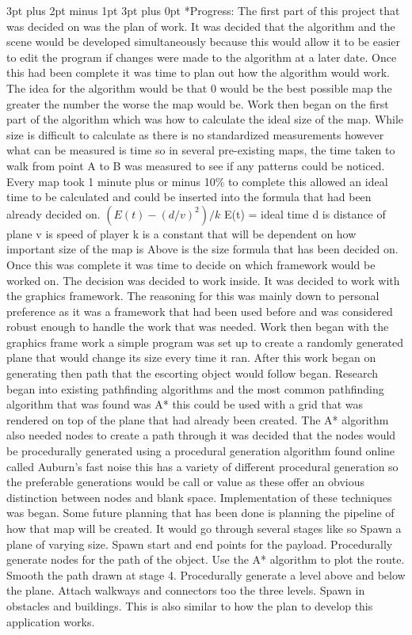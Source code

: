\documentclass[12pt,a4paper,oneside]{book}
\makeatletter
\renewcommand\subsection{\@startsection {subsection}{1}{2mm} %
                               {3pt plus 2pt minus 1pt} %
                               {3pt plus 0pt} %
                               {\normalfont\bfseries}}
\makeatother
\begin{document}
\begin{appendices}
\subsection*{Progress:}
The first part of this project that was decided on was the plan of work. It was decided that the algorithm and the scene would be developed simultaneously because this would allow it to be easier to edit the program if changes were made to the algorithm at a later date. Once this had been complete it was time to plan out how the algorithm would work. The idea for the algorithm would be that 0 would be the best possible map the greater the number the worse the map would be. Work then began on the first part of the algorithm which was how to calculate the ideal size of the map. While size is difficult to calculate as there is no standardized measurements however what can be measured is time so in several pre-existing maps, the time taken to walk from point A to B was measured to see if any patterns could be noticed. Every map took 1 minute plus or minus 10\% to complete this allowed an ideal time to be calculated and could be inserted into the formula that had been already decided on.
\newline
\((E(t)-(d/v)^2)/k\)
\newline
E(t) = ideal time 
d is distance of plane
v is speed of player 
k is a constant that will be dependent on how important size of the map is
Above is the size formula that has been decided on. Once this was complete it was time to decide on which framework would be worked on. The decision was decided to work inside. It was decided to work with the graphics framework. The reasoning for this was mainly down to personal preference as it was a framework that had been used before and was considered robust enough to handle the work that was needed. 
Work then began with the graphics frame work a simple program was set up to create a randomly generated plane that would change its size every time it ran. After this work began on generating then path that the escorting object would follow began. 
Research began into existing pathfinding algorithms and the most common pathfinding algorithm that was found was A* this could be used with a grid that was rendered on top of the plane that had already been created. The A* algorithm also needed nodes to create a path through it was decided that the nodes would be procedurally generated using a procedural generation algorithm found online called Auburn’s fast noise this has a variety of different procedural generation so the preferable generations would be call or value as these offer an obvious distinction between nodes and blank space. 
Implementation of these techniques was began.
Some future planning that has been done is planning the pipeline of how that map will be created. It would go through several stages like so
Spawn a plane of varying size.
Spawn start and end points for the payload.
Procedurally generate nodes for the path of the object.
Use the A* algorithm to plot the route.
Smooth the path drawn at stage 4.
Procedurally generate a level above and below the plane.
Attach walkways and connectors too the three levels.
Spawn in obstacles and buildings.
This is also similar to how the plan to develop this application works.   


\end{appendices}
\end{document}
